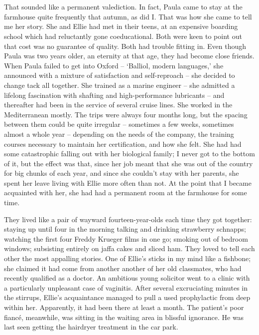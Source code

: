 \section{}

That sounded like a permanent valediction. In fact, Paula came to stay at the farmhouse quite frequently that autumn, as did I. That was how she came to tell me her story. She and Ellie had met in their teens, at an expensive boarding school which had reluctantly gone coeducational. Both were keen to point out that cost was no guarantee of quality. Both had trouble fitting in. Even though Paula was two years older, an eternity at that age, they had become close friends. When Paula failed to get into Oxford -- `Balliol, modern languages,' she announced with a mixture of satisfaction and self-reproach -- she decided to change tack all together. She trained as a marine engineer -- she admitted a lifelong fascination with shafting and high-performance lubricants -- and thereafter had been in the service of several cruise lines. She worked in the Mediterranean mostly. The trips were always four months long, but the spacing between them could be quite irregular -- sometimes a few weeks, sometimes almost a whole year -- depending on the needs of the company, the training courses necessary to maintain her certification, and how she felt. She had had some catastrophic falling out with her biological family; I never got to the bottom of it, but the effect was that, since her job meant that she was out of the country for big chunks of each year, and since she couldn't stay with her parents, she spent her leave living with Ellie more often than not. At the point that I became acquainted with her, she had had a permanent room at the farmhouse for some time.

They lived like a pair of wayward fourteen-year-olds each time they got together: staying up until four in the morning talking and drinking strawberry schnapps; watching the first four Freddy Krueger films in one go; smoking out of bedroom windows; subsisting entirely on jaffa cakes and sliced ham. They loved to tell each other the most appalling stories. One of Ellie's sticks in my mind like a fishbone; she claimed it had come from another another of her old classmates, who had recently qualified as a doctor. An ambitious young solicitor went to a clinic with a particularly unpleasant case of vaginitis. After several excruciating minutes in the stirrups, Ellie's acquaintance managed to pull a used prophylactic from deep within her. Apparently, it had been there at least a month. The patient's poor fianc\'e, meanwhile, was sitting in the waiting area in blissful ignorance. He was last seen getting the hairdryer treatment in the car park.

